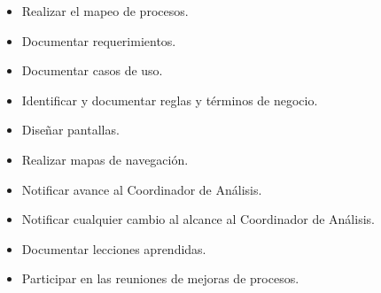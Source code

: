 \documentclass[10pt]{article}
\begin{document}
\begin{itemize}
 \item Realizar el mapeo de procesos.
 \item Documentar requerimientos.
 \item Documentar casos de uso.
 \item Identificar y documentar reglas y términos de negocio.
 \item Diseñar pantallas.
 \item Realizar mapas de navegación.
 \item Notificar avance al Coordinador de Análisis.
 \item Notificar cualquier cambio al alcance al Coordinador de Análisis.
 \item Documentar lecciones aprendidas.
 \item Participar en las reuniones de mejoras de procesos.\\
\end{itemize}
\end{document}
